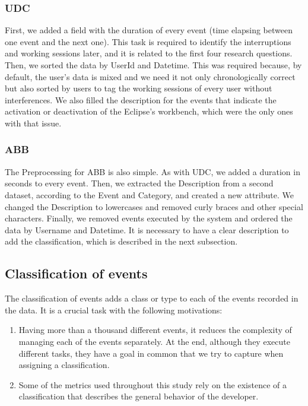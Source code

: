 \begin{changedforreviewerlong}
\subsubsection{UDC}
First, we added a field with the duration of every event (time elapsing between one event and the next one). This task is required to identify the interruptions and working sessions later, and it is related to the first four research questions. Then, we sorted the data by UserId and Datetime. This was required because, by default, the user's data is mixed and we need it not only chronologically correct but also sorted by users to tag the working sessions of every user without interferences. We also filled the description for the events that indicate the activation or deactivation of the Eclipse's workbench, which were the only ones with that issue.

\subsubsection{ABB}
The Preprocessing for ABB is also simple. As with UDC, we added a duration in seconds to every event. Then, we extracted the Description from a second dataset, according to the Event and Category, and created a new attribute. We changed the Description to lowercases and removed curly braces and other special characters. Finally, we removed events executed by the system and ordered the data by Username and Datetime. It is necessary to have a clear description to add the classification, which is described in the next subsection.



\subsection{Classification of events}
The classification of events adds a class or type to each of the events recorded in the data. It is a crucial task with the following motivations:
\begin{enumerate}
	\item Having more than a thousand different events, it reduces the complexity of managing each of the events separately. At the end, although they execute different tasks, they have a goal in common that we try to capture when assigning a classification.
	\item Some of the metrics used throughout this study rely on the existence of a classification that describes the general behavior of the developer.
\end{enumerate}


\end{changedforreviewerlong}
